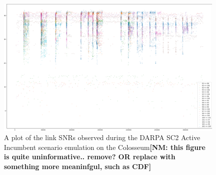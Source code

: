 \documentclass[12pt, draftcls, onecolumn]{IEEEtran}
\newcommand{\nm}[1]{{\color{blue}\bf{[NM: #1]}}}
\begin{document}
\begin{figure} [htb]
    \centerline{
    \includegraphics[width = 0.8\linewidth]{figures/Active_Incumbent_Scenario_Link_SNRs.png}}
    \caption{A plot of the link SNRs observed during the DARPA SC2 Active Incumbent scenario emulation on the Colosseum\nm{this figure is quite uninformative.. remove? OR replace with something more meaninfgul, such as CDF}}
    \label{fig: Y. 2}
\end{figure}
\end{document}
